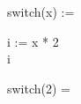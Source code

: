 

    \begin{preproc}

        switch(x) := \begin{block}
             i := x * 2 \\
             i
        \end{block}

        switch(2) = \placeholder{} \\

    \end{preproc}

